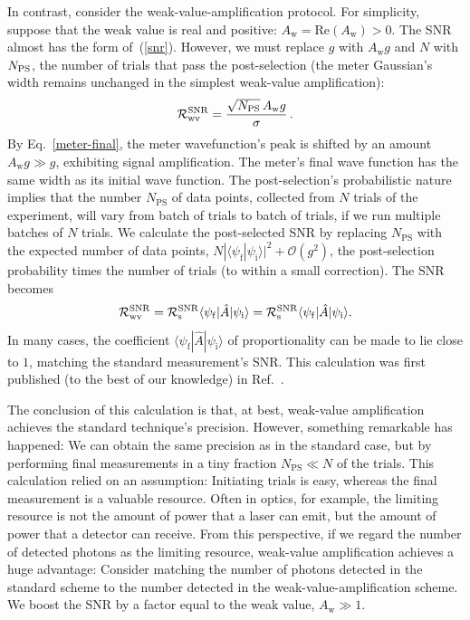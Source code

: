 \documentclass[%
 reprint,
superscriptaddress,
nofootinbib,
bibnotes,
 amsmath,amssymb,
 aps,
]{revtex4-1}
\theoremstyle{plain}
\def\la{\langle}
\def\ra{\rangle}
\def\be{\begin{equation}}
\def\ee{\end{equation}}
\begin{document}
In contrast, consider the weak-value-amplification protocol. For simplicity, suppose that the weak value is real and positive:  
$A_{\mathrm{w}} = \text{Re}(A_{\mathrm{w}}) > 0$.
The SNR almost has the form of~(\ref{snr}).
However, we must replace $g$ with $A_{\mathrm{w}} g$ and $N$ with  $N_{\rm PS}$, the number of trials that pass the post-selection
(the meter Gaussian's width remains unchanged in the simplest weak-value amplification):
\be
{\cal R}^{\mathrm{SNR}} _{\mathrm{wv}} = \frac{ \sqrt{N_{\rm PS}} \, A_{\mathrm{w}} g}{\sigma} \, .
\label{rwv}
\ee 
By Eq.~\eqref{meter-final}, the meter wavefunction's peak is shifted by an amount $A_{\mathrm{w}} g \gg g$, exhibiting signal amplification.  
The meter's final wave function has the same width as its initial wave function.  The post-selection's probabilistic nature implies that the number $N_{\mathrm{PS}}$ of data points, collected from $N$ trials of the experiment, will vary from batch of trials to batch of trials, if we run multiple batches of $N$ trials.   
We calculate the post-selected SNR by replacing $N_{\mathrm{PS}}$
with the expected number of data points, $ N |\la \psi_{\mathrm{f}} | \psi_{\mathrm{i}}\ra|^2 + \mathcal{O}(g^2)$, the post-selection probability times the number of trials (to within a small correction).   The SNR becomes
\begin{equation}
    {\cal R}^{\mathrm{SNR}} _{\mathrm{wv}} = {\cal R}^{\mathrm{SNR}} _{\mathrm{s}} \la  \psi_{\mathrm{f}} | {\hat A}| \psi_{\mathrm{i}}\ra
=
{\cal R}^{\mathrm{SNR}} _{\mathrm{s}} \la  \psi_{\mathrm{f}} |{\hat A} | \psi_{\mathrm{i}} \ra.
\end{equation}
In many cases, the coefficient 
$\la  \psi_{\mathrm{f}} |{\hat A} | \psi_{\mathrm{i}} \ra$
of proportionality can be made to lie close to $1$, matching the standard measurement's SNR.  This calculation was first published (to the best of our knowledge) in Ref.~\cite{Starling09}.  


The conclusion of this calculation is that, at best, weak-value amplification achieves the standard technique's precision.  However, something remarkable has happened:  We can obtain the same precision as in the standard case, but by 
performing final measurements in
a tiny fraction $N_{\mathrm{PS}} \ll N$ of the trials.
This calculation relied on an assumption: Initiating trials is easy, whereas the final measurement is a valuable resource.
Often in optics, for example, the limiting resource
is not the amount of power that a laser can emit, but the amount of power that a detector can receive.  From this perspective, if we regard the number of detected photons as the limiting resource, weak-value amplification achieves a huge advantage: Consider matching the number of photons detected in the standard scheme to the number detected in the weak-value-amplification scheme. We boost  the SNR by a factor equal to the weak value, $A_{\mathrm{w}} \gg 1$.
\end{document}

